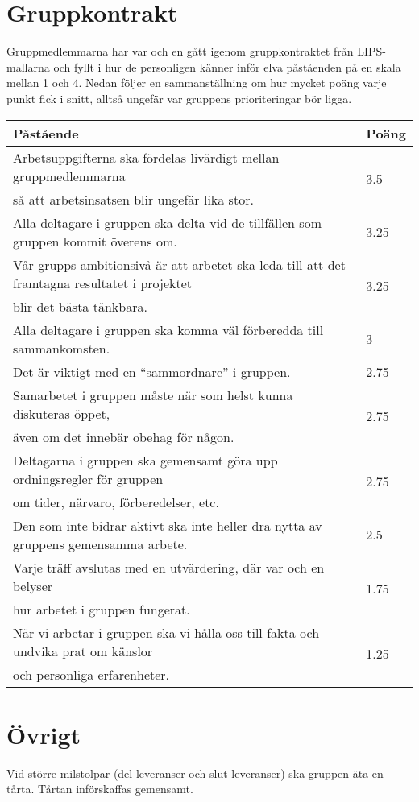 \documentclass[10pt,swedish,oneside]{lips-no_customer}
\begin{document}
    \section{Gruppkontrakt}
        Gruppmedlemmarna har var och en gått igenom gruppkontraktet från LIPS-mallarna och fyllt i hur de personligen känner inför elva påståenden på en skala mellan 1 och 4. Nedan följer en sammanställning om hur mycket poäng varje punkt fick i snitt, alltså ungefär var gruppens prioriteringar bör ligga. \vspace{1em}

        \begin{tabular}{|l|l|} \hline
            \bfseries Påstående & \bfseries Poäng \\\hline
            Arbetsuppgifterna ska fördelas livärdigt mellan gruppmedlemmarna & \multirow{2}{3em}{3.5} \\ så att arbetsinsatsen blir ungefär lika stor. &  \\\hline
            Alla deltagare i gruppen ska delta vid de tillfällen som gruppen kommit överens om. & 3.25 \\\hline
            Vår grupps ambitionsivå är att arbetet ska leda till att det framtagna resultatet i projektet & \multirow{2}{3em}{3.25} \\ blir det bästa tänkbara. & \\\hline
            Alla deltagare i gruppen ska komma väl förberedda till sammankomsten. & 3 \\\hline
            Det är viktigt med en ``sammordnare'' i gruppen. & 2.75 \\\hline
            Samarbetet i gruppen måste när som helst kunna diskuteras öppet, & \multirow{2}{3em}{2.75} \\ även om det innebär obehag för någon. & \\\hline
            Deltagarna i gruppen ska gemensamt göra upp ordningsregler för gruppen & \multirow{2}{3em}{2.75} \\ om tider, närvaro, förberedelser, etc. & \\\hline
            Den som inte bidrar aktivt ska inte heller dra nytta av gruppens gemensamma arbete. & 2.5 \\\hline
            Varje träff avslutas med en utvärdering, där var och en belyser & \multirow{2}{3em}{1.75} \\ hur arbetet i gruppen fungerat. & \\\hline
            När vi arbetar i gruppen ska vi hålla oss till fakta och undvika prat om känslor & \multirow{2}{3em}{1.25} \\ och personliga erfarenheter. &\\\hline
        \end{tabular}
    \section{Övrigt}
        Vid större milstolpar (del-leveranser och slut-leveranser) ska gruppen äta en tårta. Tårtan införskaffas gemensamt.
\end{document}
